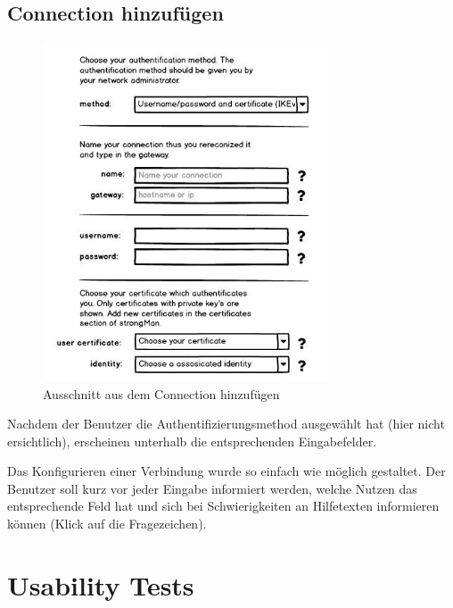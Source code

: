 \subsection{Connection hinzufügen}
\noindent\begin{minipage}{0.55\textwidth}
    \begin{figure}[H]
    	\centering
    	\includegraphics[width=240pt]{images/mockups/short_con_config.jpg}
    	\caption{Ausschnitt aus dem Connection hinzufügen}
    \end{figure}
\end{minipage}
\hfill
\begin{minipage}{0.45\textwidth}
Nachdem der Benutzer die Authentifizierungsmethod ausgewählt hat (hier nicht ersichtlich), erscheinen unterhalb die entsprechenden Eingabefelder.

Das Konfigurieren einer Verbindung wurde so einfach wie möglich gestaltet. Der Benutzer soll kurz vor jeder Eingabe informiert werden, welche Nutzen das entsprechende Feld hat und sich bei Schwierigkeiten an Hilfetexten informieren können (Klick auf die Fragezeichen).
\end{minipage}


\section{Usability Tests}